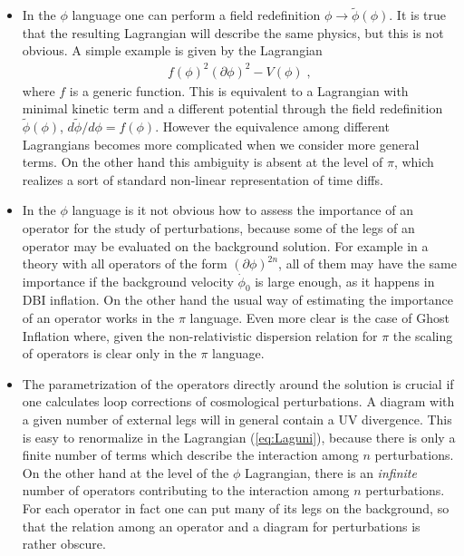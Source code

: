 \documentclass[12pt,letterpaper]{article}
\def\be{\begin{eqnarray}}
\def\ee{\end{eqnarray}}
\begin{document}
{\begin{itemize}
\item In the $\phi$ language one can perform a field redefinition
  $\phi \to \tilde\phi(\phi)$. It is true that the resulting Lagrangian will
  describe the same physics, but this is not obvious. A simple example
  is given by the Lagrangian 
\be
f(\phi)^2 (\partial\phi)^2 -V(\phi) \;,
\ee
where $f$ is a generic function.
This is equivalent to a Lagrangian with minimal kinetic
term and a different potential through the field redefinition
$\tilde\phi(\phi)$, $d\tilde\phi/d\phi = f(\phi)$. However the
equivalence among different Lagrangians becomes more complicated when
we consider more general terms.
On the other  hand this ambiguity is absent at the level of $\pi$, which realizes
a sort of standard non-linear representation of time diffs. 


\item In the $\phi$ language is it not obvious how to assess the importance of an operator for the study of perturbations, because some of the legs of an operator may be evaluated on the background solution. For example in a theory with all operators of the form $(\partial\phi)^{2n}$, all of them may have the same importance if the background velocity $\dot\phi_0$ is large enough, as it happens in DBI inflation.  On the other hand the usual way of estimating the importance of an operator works in the $\pi$ language. Even more clear is the case of Ghost Inflation where, given the non-relativistic dispersion relation for $\pi$ the scaling of operators is clear only in the $\pi$ language.

\item The parametrization of the operators directly around the
  solution is crucial if one calculates loop corrections of
  cosmological perturbations. A diagram with a given number of
  external legs will in general contain a UV divergence. This is easy
  to renormalize in the Lagrangian (\ref{eq:Laguni}), because there is
  only a finite number of terms which describe the interaction among
  $n$ perturbations. On the other hand at the level of the $\phi$
  Lagrangian, there is an {\em infinite} number of operators contributing to
  the interaction among $n$ perturbations. For each operator in fact
  one can put many of its legs on the background, so that the relation
  among an operator and a diagram for perturbations is rather obscure. 
 
\end{itemize}




}
\end{document}
